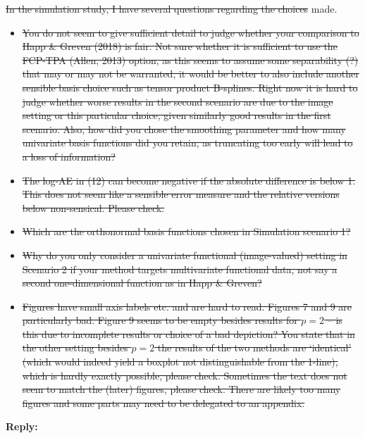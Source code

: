 \documentclass[11pt]{article}
\begin{document}
\sout{In the simulation study, I have several questions regarding the choices }made.
\begin{itemize}
  \item \sout{You do not seem to give sufficient detail to judge whether your comparison to Happ \& Greven (2018) is fair. Not sure whether it is sufficient to use the FCP-TPA (Allen, 2013) option, as this seems to assume some separability (?) that may or may not be warranted, it would be better to also include another sensible basis choice such as tensor product B-splines. Right now it is hard to judge whether worse results in the second scenario are due to the image setting or this particular choice, given similarly good results in the first scenario. Also, how did you chose the smoothing parameter and how many univariate basis functions did you retain, as truncating too early will lead to a loss of information?}
  \item \sout{The log-AE in (12) can become negative if the absolute difference is below 1. This does not seem like a sensible error measure and the relative versions below non-sensical. Please check.}
  \item \sout{Which are the orthonormal basis functions chosen in Simulation scenario 1?}
  \item \sout{Why do you only consider a univariate functional (image-valued) setting in Scenario 2 if your method targets multivariate functional data, not say a second one-dimensional function as in Happ \& Greven?}
  \item \sout{Figures have small axis labels etc. and are hard to read. Figures 7 and 9 are particularly bad. Figure 9 seems to be empty besides results for $p=2$ – is this due to incomplete results or choice of a bad depiction? You state that in the other setting besides $p=2$ the results of the two methods are ‘identical’ (which would indeed yield a boxplot not distinguishable from the 1-line), which is hardly exactly possible, please check. Sometimes the text does not seem to match the (later) figures, please check. There are likely too many figures and some parts may need to be delegated to an appendix.}
\end{itemize}


\medskip

\normalfont

\textbf{Reply:}
\end{document}

